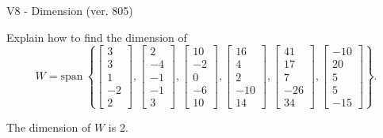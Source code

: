 \begin{exercise}
  \begin{exerciseTitle}V8 - Dimension (ver. 805)\end{exerciseTitle}
  \begin{exerciseStatement}
    Explain how to find the dimension of 
\[W=\mathrm{span}\ \left\{\left[\begin{array}{r}
3 \\
3 \\
1 \\
-2 \\
2
\end{array}\right] , \left[\begin{array}{r}
2 \\
-4 \\
-1 \\
-1 \\
3
\end{array}\right] , \left[\begin{array}{r}
10 \\
-2 \\
0 \\
-6 \\
10
\end{array}\right] , \left[\begin{array}{r}
16 \\
4 \\
2 \\
-10 \\
14
\end{array}\right] , \left[\begin{array}{r}
41 \\
17 \\
7 \\
-26 \\
34
\end{array}\right] , \left[\begin{array}{r}
-10 \\
20 \\
5 \\
5 \\
-15
\end{array}\right]\right\}.\]



  \end{exerciseStatement}
  \begin{exerciseAnswer}
   The dimension of \(W\) is  \(2\).
  


  \end{exerciseAnswer}
\end{exercise}